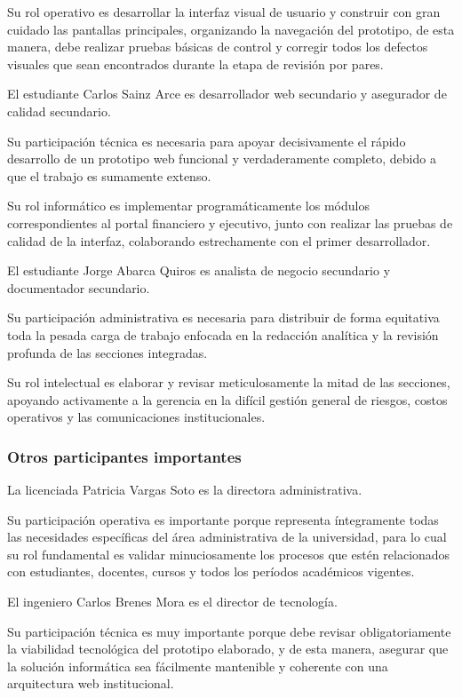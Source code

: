 \documentclass[11pt,spanish]{article}
\begin{document}
Su rol operativo es desarrollar la interfaz visual de usuario y construir con gran cuidado las pantallas principales, organizando la navegación del prototipo, de esta manera, debe realizar pruebas básicas de control y corregir todos los defectos visuales que sean encontrados durante la etapa de revisión por pares.

El estudiante Carlos Sainz Arce es desarrollador web secundario y asegurador de calidad secundario.

Su participación técnica es necesaria para apoyar decisivamente el rápido desarrollo de un prototipo web funcional y verdaderamente completo, debido a que el trabajo es sumamente extenso.

Su rol informático es implementar programáticamente los módulos correspondientes al portal financiero y ejecutivo, junto con realizar las pruebas de calidad de la interfaz, colaborando estrechamente con el primer desarrollador.

El estudiante Jorge Abarca Quiros es analista de negocio secundario y documentador secundario.

Su participación administrativa es necesaria para distribuir de forma equitativa toda la pesada carga de trabajo enfocada en la redacción analítica y la revisión profunda de las secciones integradas.

Su rol intelectual es elaborar y revisar meticulosamente la mitad de las secciones, apoyando activamente a la gerencia en la difícil gestión general de riesgos, costos operativos y las comunicaciones institucionales.

\subsubsection{Otros participantes importantes}

La licenciada Patricia Vargas Soto es la directora administrativa.

Su participación operativa es importante porque representa íntegramente todas las necesidades específicas del área administrativa de la universidad, para lo cual su rol fundamental es validar minuciosamente los procesos que estén relacionados con estudiantes, docentes, cursos y todos los períodos académicos vigentes.

El ingeniero Carlos Brenes Mora es el director de tecnología.

Su participación técnica es muy importante porque debe revisar obligatoriamente la viabilidad tecnológica del prototipo elaborado, y de esta manera, asegurar que la solución informática sea fácilmente mantenible y coherente con una arquitectura web institucional.
\end{document}
